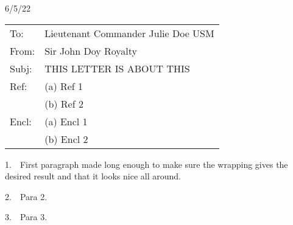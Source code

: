 \documentclass[letter,12pt]{letter}
\begin{document}
\hfill 6/5/22
\begin{tabular}{p{0.5in}p{6in}}
To: & Lieutenant Commander Julie Doe USM \\
From: & Sir John Doy Royalty \\[12pt]
Subj: & THIS LETTER IS ABOUT THIS \\[12pt]
Ref: & (a) Ref 1 \\

      & (b) Ref 2 \\
[12pt]
Encl: & (a) Encl 1 \\


      & (b) Encl 2 \\
[12pt]

\end{tabular}


1.\ \  First paragraph made long enough to make sure the wrapping gives the desired result and that it looks nice all around.\par

2.\ \  Para 2.\par

3.\ \  Para 3.\par
\end{document}
